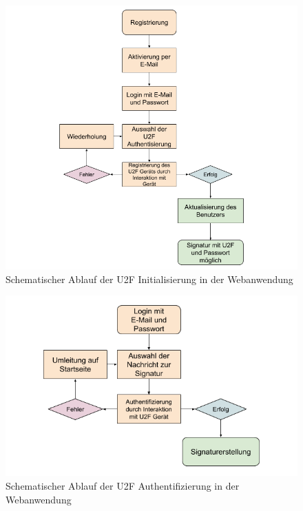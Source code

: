 \documentclass[11pt,a4paper,ngerman]{scrreprt}
\begin{document}
\begin{figure}[htbp]
    \centering
        \includegraphics[width=\textwidth]{Abbildungen/Ablauf_U2F_Initialisierung}
    \caption{Schematischer Ablauf der U2F Initialisierung in der Webanwendung}
    \label{fig:Authwebapp_u2f_init}
\end{figure}
\begin{figure}[htbp]
    \centering
        \includegraphics[width=\textwidth]{Abbildungen/Ablauf_U2F}
    \caption{Schematischer Ablauf der U2F Authentifizierung in der Webanwendung}
    \label{fig:Authwebapp_u2f_auth}
\end{figure}
\clearpage
\end{document}
